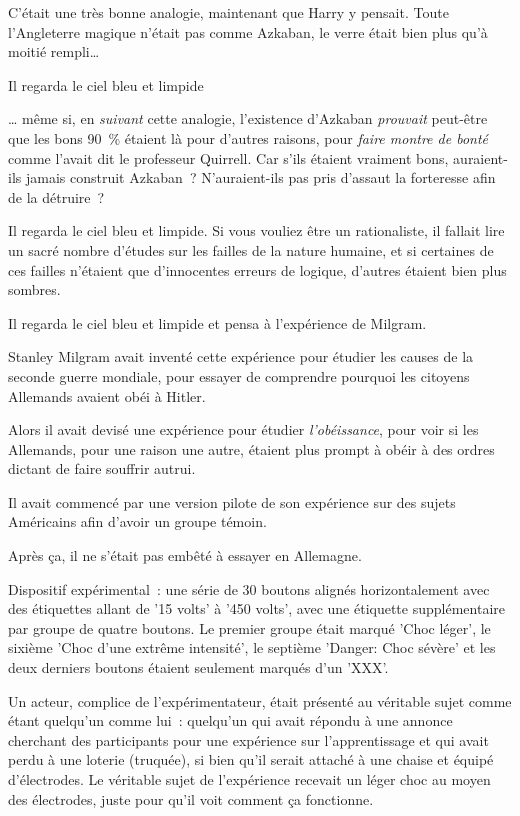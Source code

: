 C'était une très bonne analogie, maintenant que Harry y pensait. Toute l'Angleterre magique n'était pas comme Azkaban, le verre était bien plus qu'à moitié rempli…

Il regarda le ciel bleu et limpide

… même si, en \emph{suivant} cette analogie, l'existence d'Azkaban \emph{prouvait} peut-être que les bons 90~\% étaient là pour d'autres raisons, pour \emph{faire montre de bonté} comme l'avait dit le professeur Quirrell. Car s'ils étaient vraiment bons, auraient-ils jamais construit Azkaban~? N'auraient-ils pas pris d'assaut la forteresse afin de la détruire~?

Il regarda le ciel bleu et limpide. Si vous vouliez être un rationaliste, il fallait lire un sacré nombre d'études sur les failles de la nature humaine, et si certaines de ces failles n'étaient que d'innocentes erreurs de logique, d'autres étaient bien plus sombres.

Il regarda le ciel bleu et limpide et pensa à l'expérience de Milgram.

Stanley Milgram avait inventé cette expérience pour étudier les causes de la seconde guerre mondiale, pour essayer de comprendre pourquoi les citoyens Allemands avaient obéi à Hitler.

Alors il avait devisé une expérience pour étudier \emph{l'obéissance}, pour voir si les Allemands, pour une raison une autre, étaient plus prompt à obéir à des ordres dictant de faire souffrir autrui.

Il avait commencé par une version pilote de son expérience sur des sujets Américains afin d'avoir un groupe témoin.

Après ça, il ne s'était pas embêté à essayer en Allemagne.

Dispositif expérimental~: une série de 30 boutons alignés horizontalement avec des étiquettes allant de '15 volts' à '450 volts', avec une étiquette supplémentaire par groupe de quatre boutons. Le premier groupe était marqué 'Choc léger', le sixième 'Choc d'une extrême intensité', le septième 'Danger: Choc sévère' et les deux derniers boutons étaient seulement marqués d'un 'XXX'.

Un acteur, complice de l'expérimentateur, était présenté au véritable sujet comme étant quelqu'un comme lui~: quelqu'un qui avait répondu à une annonce cherchant des participants pour une expérience sur l'apprentissage et qui avait perdu à une loterie (truquée), si bien qu'il serait attaché à une chaise et équipé d'électrodes. Le véritable sujet de l'expérience recevait un léger choc au moyen des électrodes, juste pour qu'il voit comment ça fonctionne.

